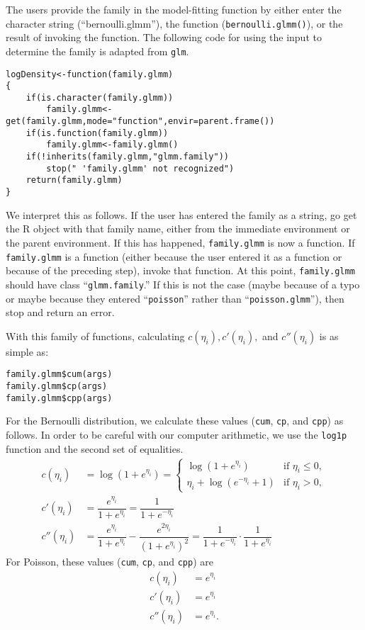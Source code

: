 \documentclass{article}
\begin{document}
The users provide the family in the model-fitting function by either enter the character string (``bernoulli.glmm''), the function (\texttt{bernoulli.glmm()}), or the result of invoking the function.  The following code for using the input to determine the family is adapted from \texttt{glm}.

\begin{verbatim}
logDensity<-function(family.glmm)
{
	if(is.character(family.glmm))
		family.glmm<-get(family.glmm,mode="function",envir=parent.frame())
	if(is.function(family.glmm))
		family.glmm<-family.glmm()
	if(!inherits(family.glmm,"glmm.family")) 
		stop(" 'family.glmm' not recognized") 
	return(family.glmm)
}
\end{verbatim}
We interpret this as follows.  If the user has entered the family as a string, go get the R object with that family name, either from the immediate environment or the parent environment.  If this has happened, \texttt{family.glmm} is now a function.  If \texttt{family.glmm} is a function (either because the user entered it as a function or because of the preceding step), invoke that function.  At this point, \texttt{family.glmm} should have  class ``\texttt{glmm.family}.'' If this is not the case (maybe because of a typo or maybe because they entered ``\texttt{poisson}'' rather than ``\texttt{poisson.glmm}''), then stop and return an error.

With this family of functions, calculating $c(\eta_i), c'(\eta_i),$ and  $c''(\eta_i)$ is as simple as: 
\begin{verbatim}
family.glmm$cum(args)
family.glmm$cp(args)
family.glmm$cpp(args)
\end{verbatim}

For the Bernoulli distribution, we calculate these values (\texttt{cum}, \texttt{cp}, and \texttt{cpp}) as follows. In order to be careful with our computer arithmetic, we use the \texttt{log1p} function and the second set of equalities.  
\begin{align}
c(\eta_i) &= \log(1+e^{\eta_i}) =
  \begin{cases}
    \log(1+e^{\eta_i}) & \text{if } \eta_i\leq 0,\\
    \eta_i+\log(e^{-\eta_i}+1) & \text{if } \eta_i >0,
  \end{cases}\\
c'(\eta_i)&=\dfrac{ e^{{\eta_{i}}}}{ 1+e^{{\eta_{i}}}} = \dfrac{1}{1+e^{-\eta_i}}\\
c''(\eta_i)&=   \dfrac{e^{{\eta_{i}}}}{  1+ e^{{\eta_{i}}} }  - \dfrac{e^{2{\eta_{i}}}}{    (  1+ e^{{\eta_{i}}})^2}  = \dfrac{1}{1+e^{-\eta_i}}\cdot \dfrac{1}{1+e^{\eta_i}}
\end{align}
 For Poisson, these values (\texttt{cum}, \texttt{cp}, and \texttt{cpp}) are
\begin{align}
c(\eta_i)&=e^{\eta_i}\\
c'(\eta_i)&=e^{{\eta_{i}}}\\
c''(\eta_i)&= e^{{\eta_{i}}}.
\end{align}
\end{document}

